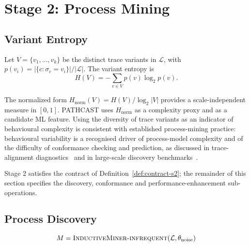 \section{Stage 2: Process Mining}
\label{sec:stage2}

\subsection{Variant Entropy}
\label{sec:variant-entropy}

\begin{definition}
\label{def:variant-entropy}
Let $V = \{v_1, \ldots, v_k\}$ be the distinct trace variants in
$\mathcal{L}$, with $p(v_i) = |\{c : \sigma_c = v_i\}| / |\mathcal{L}|$.
The variant entropy is
\begin{equation}
H(V) = -\sum_{v \in V} p(v) \log_2 p(v).
\label{eq:variant-entropy}
\end{equation}
\end{definition}

The normalized form $H_{\text{norm}}(V) = H(V) / \log_2 |V|$ provides a
scale-independent measure in $[0, 1]$. PATHCAST uses $H_{\text{norm}}$ as
a complexity proxy and as a candidate ML feature. Using the diversity of
trace variants as an indicator of behavioural complexity is consistent with
established process-mining practice: behavioural variability is a recognised
driver of process-model complexity and of the difficulty of conformance
checking and prediction, as discussed in trace-alignment
diagnostics~\cite{bose2013trace} and in large-scale discovery
benchmarks~\cite{augusto2019}.

Stage 2 satisfies the contract of Definition~\ref{def:contract-s2}; the
remainder of this section specifies the discovery, conformance and
performance-enhancement sub-operations.


\subsection{Process Discovery}
\label{sec:s2-discovery}

\begin{equation}
\label{eq:discovery}
M = \textsc{InductiveMiner-infrequent}(\mathcal{L}, \theta_{\text{noise}})
\end{equation}

